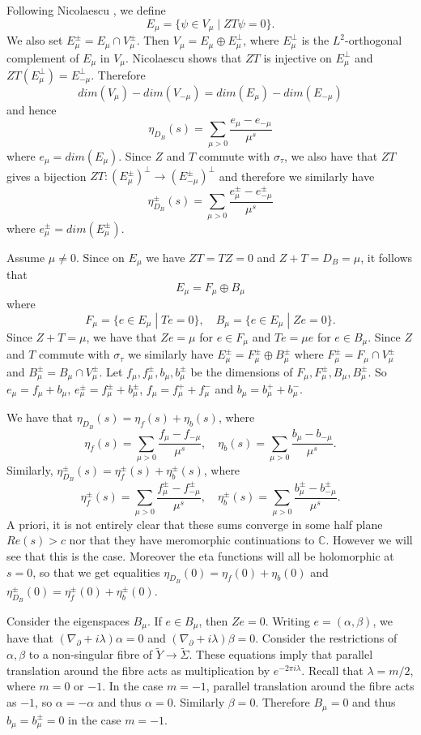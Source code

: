 \documentclass{amsart}
\theoremstyle{definition}
\theoremstyle{remark}
\numberwithin{equation}{section}
\begin{document}
Following Nicolaescu \cite[Appendix 3]{nic}, we define
\[
E_\mu = \{ \psi \in V_\mu \; | \; ZT \psi = 0 \}.
\]
We also set $E_\mu^{\pm} = E_\mu \cap V^{\pm}_{\mu}$. Then $V_\mu = E_\mu \oplus E_\mu^{\perp}$, where $E_\mu^{\perp}$ is the $L^2$-orthogonal complement of $E_\mu$ in $V_\mu$. Nicolaescu shows that $ZT$ is injective on $E_\mu^\perp$ and $ZT(E_\mu^\perp) = E_{-\mu}^\perp$. Therefore 
\[
dim(V_\mu) - dim(V_{-\mu}) = dim(E_\mu) - dim(E_{-\mu})
\]
and hence
\[
\eta_{D_B}(s) = \sum_{\mu > 0 } \frac{ e_\mu - e_{-\mu} }{\mu^s}
\]
where $e_\mu = dim(E_\mu)$. Since $Z$ and $T$ commute with $\sigma_{\tau}$, we also have that $ZT$ gives a bijection $ZT : (E_\mu^{\pm})^{\perp} \to (E_{-\mu}^{\pm})^\perp$ and therefore we similarly have
\[
\eta_{D_B}^{\pm}(s) = \sum_{\mu > 0 } \frac{ e^{\pm}_\mu - e^{\pm}_{-\mu} }{\mu^s}
\]
where $e^{\pm}_{\mu} = dim( E_\mu^{\pm})$.

Assume $\mu \neq 0$. Since on $E_\mu$ we have $ZT = TZ = 0$ and $Z+T = D_B = \mu$, it follows that 
\[
E_\mu = F_\mu \oplus B_\mu
\]
where 
\[
F_\mu = \{ e \in E_\mu \; | \; Te = 0\}, \quad B_\mu = \{ e \in E_\mu \; | \; Ze = 0\}.
\]
Since $Z+T = \mu$, we have that $Ze = \mu$ for $e \in F_\mu$ and $Te = \mu e$ for $e \in B_\mu$. Since $Z$ and $T$ commute with $\sigma_\tau$ we similarly have $E_\mu^{\pm} = F_\mu^{\pm} \oplus B_\mu^{\pm}$ where $F_\mu^{\pm} = F_\mu \cap V_{\mu}^{\pm}$ and $B_\mu^{\pm} = B_\mu \cap V_\mu^{\pm}$. Let $f_\mu , f_\mu^{\pm}, b_\mu, b_\mu^{\pm}$ be the dimensions of $F_\mu , F_\mu^{\pm} , B_\mu , B_\mu^{\pm}$. So $e_\mu = f_\mu + b_\mu$, $e_\mu^{\pm} = f_\mu^{\pm} + b_{\mu}^{\pm}$, $f_\mu = f_\mu^+ + f_\mu^{-}$ and $b_\mu = b_\mu^+ + b_\mu^{-}$.

We have that $\eta_{D_B}(s) = \eta_f(s) + \eta_b(s)$, where
\[
\eta_f(s) = \sum_{\mu > 0} \frac{f_\mu - f_{-\mu}}{\mu^s}, \quad \eta_b(s) = \sum_{\mu > 0} \frac{b_\mu - b_{-\mu}}{\mu^s}.
\]
Similarly, $\eta_{D_B}^\pm(s) = \eta^{\pm}_f(s) + \eta^{\pm}_b(s)$, where
\[
\eta_f^{\pm}(s) = \sum_{\mu > 0} \frac{f^{\pm}_\mu - f^{\pm}_{-\mu}}{\mu^s}, \quad \eta_b^{\pm}(s) = \sum_{\mu > 0} \frac{b^{\pm}_\mu - b^{\pm}_{-\mu}}{\mu^s}.
\]
A priori, it is not entirely clear that these sums converge in some half plane $Re(s) > c$ nor that they have meromorphic continuations to $\mathbb{C}$. However we will see that this is the case. Moreover the eta functions will all be holomorphic at $s=0$, so that we get equalities $\eta_{D_B}(0) = \eta_f(0) + \eta_b(0)$ and $\eta_{D_B}^\pm(0) = \eta_f^\pm(0) + \eta_b^\pm(0)$.

Consider the eigenspaces $B_\mu$. If $e \in B_\mu$, then $Ze = 0$. Writing $e = (\alpha , \beta)$, we have that $(\nabla_\partial + i\lambda)\alpha = 0$ and $(\nabla_\partial + i\lambda)\beta = 0$. Consider the restrictions of $\alpha,\beta$ to a non-singular fibre of $\widetilde{Y} \to \widetilde{\Sigma}$. These equations imply that parallel translation around the fibre acts as multiplication by $e^{-2\pi i \lambda}$. Recall that $\lambda = m/2$, where $m = 0$ or $-1$. In the case $m=-1$, parallel translation around the fibre acts as $-1$, so $\alpha = -\alpha$ and thus $\alpha = 0$. Similarly $\beta = 0$. Therefore $B_\mu = 0$ and thus $b_\mu = b_\mu^{\pm} = 0$ in the case $m=-1$.
\end{document}
